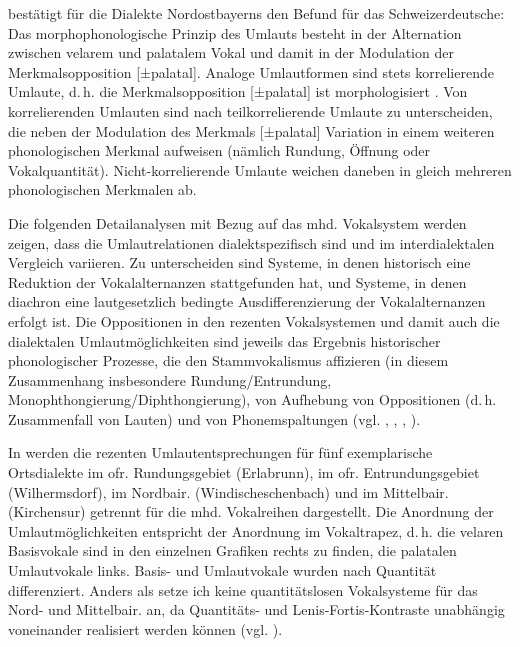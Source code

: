 \citet[117]{Rowley1997} bestätigt für die Dialekte Nordostbayerns den Befund  für das Schweizerdeutsche: Das morphophonologische Prinzip des Umlauts besteht in der Alternation zwischen velarem und palatalem Vokal und damit in der Modulation der Merkmalsopposition [±palatal]. Analoge Umlautformen sind stets korrelierende Umlaute, d.\,h. die Merkmalsopposition [±palatal] ist morphologisiert \citep[117]{Rowley1997}. Von korrelierenden Umlauten sind nach \citet[118]{Rowley1997} teilkorrelierende Umlaute zu unterscheiden, die neben der Modulation des Merkmals [±palatal] Variation in einem weiteren phonologischen Merkmal aufweisen (nämlich Rundung, Öffnung oder Vokalquantität). Nicht-korrelierende Umlaute weichen daneben in gleich mehreren phonologischen Merkmalen ab.

Die folgenden Detailanalysen mit Bezug auf das mhd. Vokalsystem werden zeigen, dass die Umlautrelationen dialektspezifisch sind und im interdialektalen Vergleich variieren. Zu unterscheiden sind Systeme, in denen historisch eine Reduktion der Vokalalternanzen stattgefunden hat, und Systeme, in denen diachron eine lautgesetzlich bedingte Ausdifferenzierung der Vokalalternanzen erfolgt ist. Die Oppositionen in den rezenten Vokalsystemen und damit auch die dialektalen Umlautmöglichkeiten sind jeweils das Ergebnis historischer phonologischer Prozesse, die den Stammvokalismus affizieren (in diesem Zusammenhang insbesondere Rundung/Entrundung, Monophthongierung/Diphthongierung), von Aufhebung von Oppositionen (d.\,h. Zusammenfall von Lauten) und von Phonemspaltungen (vgl. \citealt[1084]{Lüssy1983}, \citealt[117]{Rowley1997}, \citealt[200--202]{Schirmunski1962}, \citealt[1046]{Wiesinger1983d}).

In  werden die rezenten Umlautentsprechungen für fünf exemplarische Ortsdialekte im ofr. Rundungsgebiet (Erlabrunn), im ofr. Entrundungsgebiet (Wilhermsdorf), im Nordbair. (Windischeschenbach) und im Mittelbair. (Kirchensur) getrennt für die mhd. Vokalreihen dargestellt. Die Anordnung der Umlautmöglichkeiten entspricht der Anordnung im Vokaltrapez, d.\,h. die velaren Basisvokale sind in den einzelnen Grafiken rechts zu finden, die palatalen Umlautvokale links. Basis- und Umlautvokale wurden nach Quantität differenziert. Anders als \citet[1049]{Wiesinger1983d} setze ich keine quantitätslosen Vokalsysteme für das Nord- und Mittelbair. an, da Quantitäts- und Lenis-Fortis-Kontraste unabhängig voneinander realisiert werden können (vgl. ).




